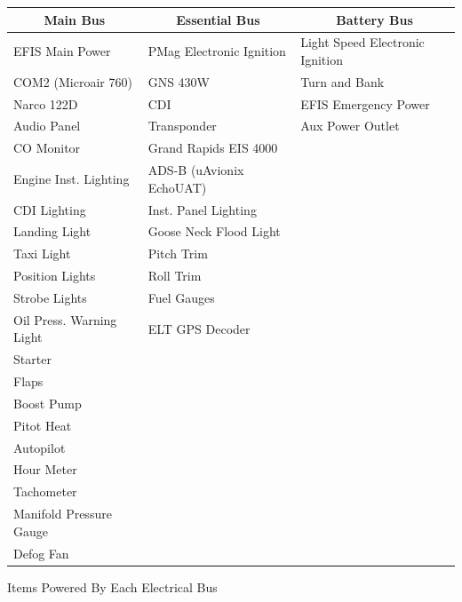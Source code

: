 \clearpage %
\begin{center}
\begin{tabular}
{|l|l|l|} \hline \multicolumn{1}{|c|}{Main Bus}& \multicolumn{1}{c|}{Essential Bus} & \multicolumn{1}{c|}{Battery Bus}\tabularnewline 
\hline \hline EFIS Main Power                       & PMag Electronic Ignition     & Light Speed Electronic Ignition \tabularnewline 
\hline COM2 (Microair 760)                          & GNS 430W                     & Turn and Bank\tabularnewline 
\hline Narco 122D                                   & CDI                          & EFIS Emergency Power\tabularnewline 
\hline Audio Panel                                  & Transponder                  & Aux Power Outlet\tabularnewline 
\hline CO Monitor                                   & Grand Rapids EIS 4000        & \tabularnewline 
\hline Engine Inst. Lighting                        & ADS-B (uAvionix EchoUAT)     & \tabularnewline 
\hline CDI Lighting                                 & Inst. Panel Lighting         & \tabularnewline 
\hline Landing Light                                & Goose Neck Flood Light       & \tabularnewline 
\hline Taxi Light                                   & Pitch Trim                   & \tabularnewline 
\hline Position Lights                              & Roll Trim                    & \tabularnewline 
\hline Strobe Lights                                & Fuel Gauges                  & \tabularnewline 
\hline Oil Press. Warning Light                     & ELT GPS Decoder              & \tabularnewline 
\hline Starter                                      &                              & \tabularnewline 
\hline Flaps                                        &                              & \tabularnewline 
\hline Boost Pump                                   &                              & \tabularnewline 
\hline Pitot Heat                                   &                              & \tabularnewline 
\hline Autopilot                                    &                              & \tabularnewline 
\hline Hour Meter                                   &                              & \tabularnewline 
\hline Tachometer                                   &                              & \tabularnewline 
\hline Manifold Pressure Gauge                      &                              & \tabularnewline 
\hline Defog Fan                                    &                              & \tabularnewline 
\hline
\end{tabular}
\caption{Items Powered By Each Electrical Bus}
\end{center}

